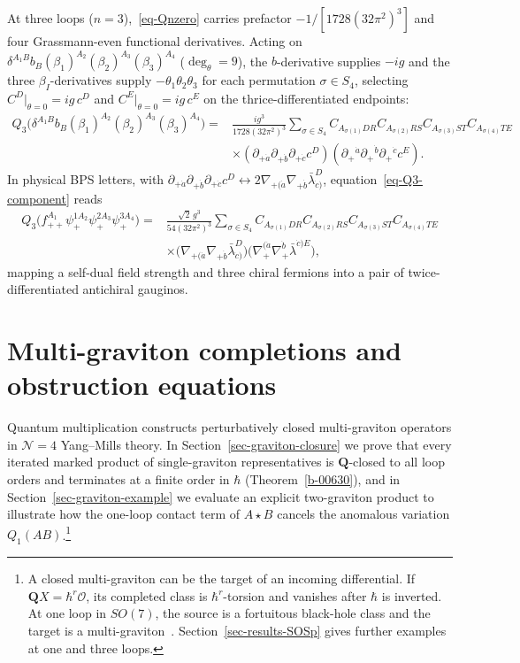 \documentclass[11pt]{article}
\numberwithin{equation}{section}
\numberwithin{figure}{section}
\numberwithin{table}{section}
\begin{document}
At three loops ($n=3$),~\eqref{eq-Qnzero} carries prefactor $-1/[1728(32\pi^2)^3]$ and four Grassmann-even functional derivatives. Acting on $\delta^{A_1B}b_B(\beta_1)^{A_2}(\beta_2)^{A_3}(\beta_3)^{A_4}$ ($\deg_\theta=9$), the $b$-derivative supplies $-ig$ and the three $\beta_I$-derivatives supply $-\theta_1\theta_2\theta_3$ for each permutation $\sigma\in S_4$, selecting $C^D|_{\theta=0}=ig\,c^D$ and $C^E|_{\theta=0}=ig\,c^E$ on the thrice-differentiated endpoints:
\begin{equation}\label{eq-Q3-component}
\begin{aligned}
Q_3\bigl(\delta^{A_1B}b_B(\beta_1)^{A_2}(\beta_2)^{A_3}(\beta_3)^{A_4}\bigr)
={}&\frac{ig^3}{1728(32\pi^2)^3}\sum_{\sigma\in S_4}
C_{A_{\sigma(1)}DR}C_{A_{\sigma(2)}RS}C_{A_{\sigma(3)}ST}C_{A_{\sigma(4)}TE}\\
&\times(\partial_{+\dot a}\partial_{+\dot b}\partial_{+\dot c}c^D)
(\partial_+{}^{\dot a}\partial_+{}^{\dot b}\partial_+{}^{\dot c}c^E).
\end{aligned}
\end{equation}
In physical BPS letters, with $\partial_{+\dot a}\partial_{+\dot b}\partial_{+\dot c}c^D\leftrightarrow2\nabla_{+(\dot a}\nabla_{+\dot b}\bar\lambda_{\dot c)}^D$, equation~\eqref{eq-Q3-component} reads
\begin{equation*}
\begin{aligned}
Q_3\bigl(f_{++}^{A_1}\psi_+^{1A_2}\psi_+^{2A_3}\psi_+^{3A_4}\bigr)
={}&\frac{\sqrt2\,g^3}{54(32\pi^2)^3}\sum_{\sigma\in S_4}
C_{A_{\sigma(1)}DR}C_{A_{\sigma(2)}RS}C_{A_{\sigma(3)}ST}C_{A_{\sigma(4)}TE}\\
&\times\bigl(\nabla_{+(\dot a}\nabla_{+\dot b}\bar\lambda_{\dot c)}^D\bigr)
\bigl(\nabla_+^{(\dot a}\nabla_+^{\dot b}\bar\lambda^{\dot c)E}\bigr),
\end{aligned}
\end{equation*}
mapping a self-dual field strength and three chiral fermions into a pair of twice-differentiated antichiral gauginos.

\section{Multi-graviton completions and obstruction equations}\label{sec-lifting}

Quantum multiplication constructs perturbatively closed multi-graviton operators in $\mathcal N=4$ Yang--Mills theory. In Section~\ref{sec-graviton-closure} we prove that every iterated marked product of single-graviton representatives is $\mathbf Q$-closed to all loop orders and terminates at a finite order in $\hbar$ (Theorem~\ref{b-00630}), and in Section~\ref{sec-graviton-example} we evaluate an explicit two-graviton product to illustrate how the one-loop contact term of $A\star B$ cancels the anomalous variation $Q_1(AB)$.\footnote{A closed multi-graviton can be the target of an incoming differential. If $\mathbf QX=\hbar^r\mathcal O$, its completed class is $\hbar^r$-torsion and vanishes after $\hbar$ is inverted. At one loop in $SO(7)$, the source is a fortuitous black-hole class and the target is a multi-graviton~\cite[Section 3]{KonishiBH}. Section~\ref{sec-results-SOSp} gives further examples at one and three loops.}
\end{document}
